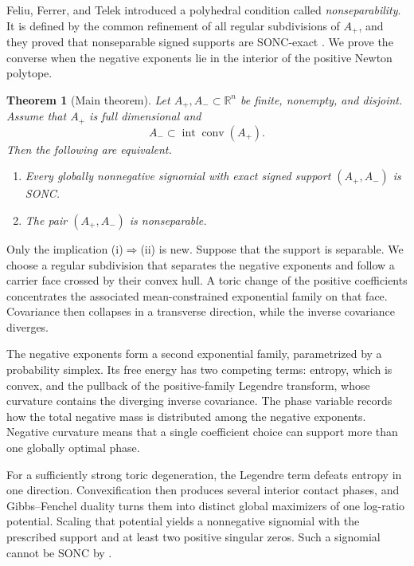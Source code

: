 \documentclass[11pt]{article}
\theoremstyle{plain}
\newtheorem{theorem}{Theorem}[section]
\theoremstyle{definition}
\theoremstyle{remark}
\newcommand{\R}{\mathbb R}
\newcommand{\conv}{\operatorname{conv}}
\begin{document}
Feliu, Ferrer, and Telek introduced a polyhedral condition called \emph{nonseparability}. It is defined by the common refinement of all regular subdivisions of $A_+$, and they proved that nonseparable signed supports are SONC-exact \cite[Theorem~3.16]{FFT}. We prove the converse when the negative exponents lie in the interior of the positive Newton polytope.

\begin{theorem}[Main theorem]\label{thm:main}
Let $A_+,A_-\subset\R^n$ be finite, nonempty, and disjoint. Assume that $A_+$ is full dimensional and
\[
 A_-\subset\operatorname{int}\conv(A_+).
\]
Then the following are equivalent.
\begin{enumerate}[label=\textup{(\roman*)}]
\item Every globally nonnegative signomial with exact signed support $(A_+,A_-)$ is SONC.
\item The pair $(A_+,A_-)$ is nonseparable.
\end{enumerate}
\end{theorem}

Only the implication \textup{(i)}$\Rightarrow$\textup{(ii)} is new. Suppose that the support is separable. We choose a regular subdivision that separates the negative exponents and follow a carrier face crossed by their convex hull. A toric change of the positive coefficients concentrates the associated mean-constrained exponential family on that face. Covariance then collapses in a transverse direction, while the inverse covariance diverges.

The negative exponents form a second exponential family, parametrized by a probability simplex. Its free energy has two competing terms: entropy, which is convex, and the pullback of the positive-family Legendre transform, whose curvature contains the diverging inverse covariance. The phase variable records how the total negative mass is distributed among the negative exponents. Negative curvature means that a single coefficient choice can support more than one globally optimal phase.

For a sufficiently strong toric degeneration, the Legendre term defeats entropy in one direction. Convexification then produces several interior contact phases, and Gibbs--Fenchel duality turns them into distinct global maximizers of one log-ratio potential. Scaling that potential yields a nonnegative signomial with the prescribed support and at least two positive singular zeros. Such a signomial cannot be SONC by \cite[Lemma~3.7]{FFT}.
\end{document}
